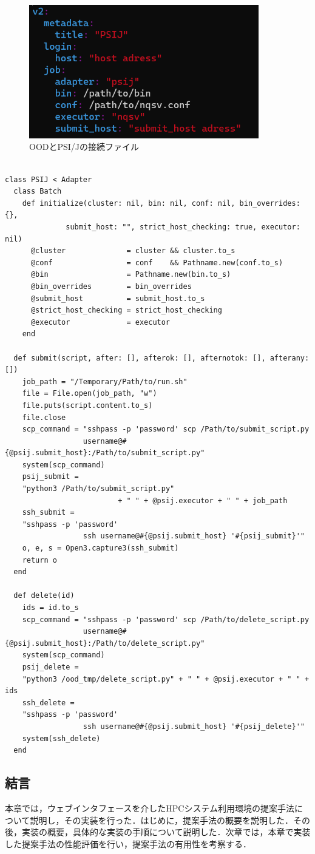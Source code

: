 \begin{figure}[tb]
    \centering
    \includegraphics[width=100mm]{./fig/PSIJ.yml.png}
    \caption{OODとPSI/Jの接続ファイル}
    \label{設定ファイル}
\end{figure}


\begin{lstlisting}[caption=PSI/JとOODの連携, label=psij_to_ood]

class PSIJ < Adapter
  class Batch
    def initialize(cluster: nil, bin: nil, conf: nil, bin_overrides: {}, 
              submit_host: "", strict_host_checking: true, executor: nil)
      @cluster              = cluster && cluster.to_s
      @conf                 = conf    && Pathname.new(conf.to_s)
      @bin                  = Pathname.new(bin.to_s)
      @bin_overrides        = bin_overrides
      @submit_host          = submit_host.to_s
      @strict_host_checking = strict_host_checking
      @executor             = executor
    end

  def submit(script, after: [], afterok: [], afternotok: [], afterany: [])
    job_path = "/Temporary/Path/to/run.sh" 
    file = File.open(job_path, "w")
    file.puts(script.content.to_s)
    file.close
    scp_command = "sshpass -p 'password' scp /Path/to/submit_script.py 
                  username@#{@psij.submit_host}:/Path/to/submit_script.py"
    system(scp_command)
    psij_submit = 
    "python3 /Path/to/submit_script.py" 
                          + " " + @psij.executor + " " + job_path
    ssh_submit = 
    "sshpass -p 'password' 
                  ssh username@#{@psij.submit_host} '#{psij_submit}'"
    o, e, s = Open3.capture3(ssh_submit)
    return o
  end
  
  def delete(id)
    ids = id.to_s
    scp_command = "sshpass -p 'password' scp /Path/to/delete_script.py 
                  username@#{@psij.submit_host}:/Path/to/delete_script.py"
    system(scp_command)
    psij_delete = 
    "python3 /ood_tmp/delete_script.py" + " " + @psij.executor + " " + ids
    ssh_delete = 
    "sshpass -p 'password' 
                  ssh username@#{@psij.submit_host} '#{psij_delete}'"
    system(ssh_delete)
  end

\end{lstlisting}

\subsection{結言}
本章では，ウェブインタフェースを介したHPCシステム利用環境の提案手法について説明し，その実装を行った．はじめに，提案手法の概要を説明した．その後，実装の概要，具体的な実装の手順について説明した．次章では，本章で実装した提案手法の性能評価を行い，提案手法の有用性を考察する．